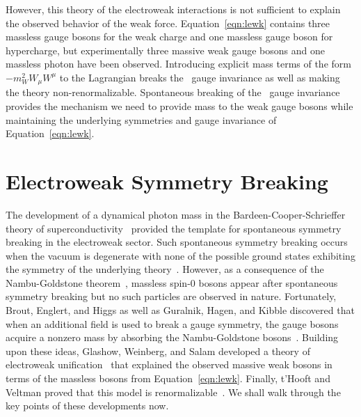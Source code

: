 However, this theory of the electroweak interactions is not sufficient to explain the observed behavior of the weak force.
Equation~\ref{eqn:lewk} contains three massless gauge bosons for the weak charge and one massless gauge boson for hypercharge, but experimentally three massive weak gauge bosons and one massless photon have been observed. 
Introducing explicit mass terms of the form $-m_W^2 W_\mu W^\mu$ to the Lagrangian breaks the \sutwo\ gauge invariance as well as making the theory non-renormalizable. 
Spontaneous breaking of the \sutwo\ gauge invariance provides the mechanism we need to provide mass to the weak gauge bosons while maintaining the underlying symmetries and gauge invariance of Equation~\ref{eqn:lewk}.

\section{Electroweak Symmetry Breaking}
\label{sec:ewsb}

The development of a dynamical photon mass in the Bardeen-Cooper-Schrieffer theory of superconductivity~\cite{Bardeen1957} provided the template for spontaneous symmetry breaking in the electroweak sector.
Such spontaneous symmetry breaking occurs when the vacuum is degenerate with none of the possible ground states exhibiting the symmetry of the underlying theory~\cite{Nambu1960, Anderson1963}.
However, as a consequence of the Nambu-Goldstone theorem~\cite{Goldstone1961, Goldstone1962}, massless spin-0 bosons appear after spontaneous symmetry breaking but no such particles are observed in nature.
Fortunately, Brout, Englert, and Higgs as well as Guralnik, Hagen, and Kibble discovered that when an additional field is used to break a gauge symmetry, the gauge bosons acquire a nonzero mass by absorbing the Nambu-Goldstone bosons~\cite{Brout1964, Higgs1964a, Higgs1964b, Higgs1966, Guralnik1964, Kibble1967}. 
Building upon these ideas, Glashow, Weinberg, and Salam developed a theory of electroweak unification~\cite{Glashow1961, Weinberg1967, Salam1968} that explained the observed massive weak bosons in terms of the massless bosons from Equation~\ref{eqn:lewk}.
Finally, t'Hooft and Veltman proved that this model is renormalizable~\cite{tHooft1972}.
We shall walk through the key points of these developments now.

